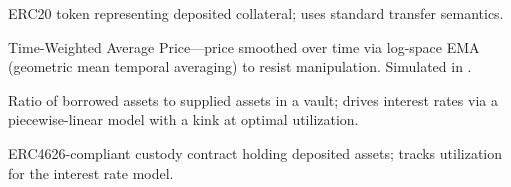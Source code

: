 \documentclass[10pt,a4paper,twocolumn]{article}
\begin{document}
\begin{description}[leftmargin=!,labelwidth=2.5cm]
    \item[Supply Position] ERC20 token representing deposited collateral; uses standard transfer semantics.

    \item[TWAP] Time-Weighted Average Price---price smoothed over time via log-space EMA (geometric mean temporal averaging) to resist manipulation. Simulated in \cite{sim}.

    \item[Utilization] Ratio of borrowed assets to supplied assets in a vault; drives interest rates via a piecewise-linear model with a kink at optimal utilization.

    \item[Vault] ERC4626-compliant custody contract holding deposited assets; tracks utilization for the interest rate model.
\end{description}

\clearpage
\ifodd\value{page}\else\thispagestyle{empty}\null\clearpage\fi
\fi
\end{document}
